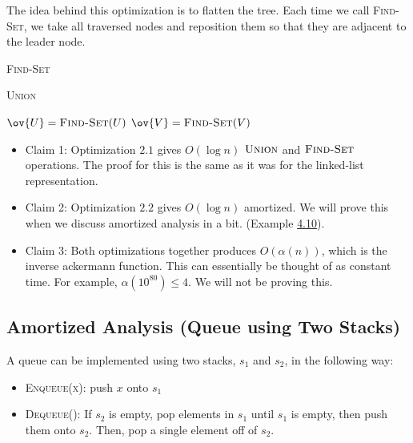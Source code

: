 The idea behind this optimization is to flatten the tree. Each time we call \textsc{Find-Set}, we take all traversed nodes and reposition them so that they are adjacent to the leader node. \V

\begin{algorithm}[H]
\DontPrintSemicolon
\SetNoFillComment

\caption{\textsc{Find-Set}}\label{alg:findset}
\end{algorithm}

\begin{algorithm}[H]
\DontPrintSemicolon
\SetNoFillComment

\caption{\textsc{Union}}\label{alg:union}
$\ov{U} = \textsc{Find-Set}(U)$\;
$\ov{V} = \textsc{Find-Set}(V)$\;
 \Return
{}  
\end{algorithm}
\begin{itemize}
    \item Claim 1: Optimization $2.1$ gives $O(\log n)$ $\textsc{Union}$ and $\textsc{Find-Set}$ operations. The proof for this is the same as it was for the linked-list representation. 
    \item Claim 2: Optimization $2.2$ gives $O(\log n)$ amortized. We will prove this when we discuss amortized analysis in a bit. (Example \hyperlink{pathcompression}{4.10}).
    \item Claim 3: Both optimizations together produces $O(\alpha(n))$, which is the \ac{inverse ackermann} function. This can essentially be thought of as constant time. For example, $\alpha(10^{80})\leq 4$. We will not be proving this. 
\end{itemize}

\subsection{Amortized Analysis (Queue using Two Stacks)}

A queue can be implemented using two stacks, $s_1$ and $s_2$, in the following way: 
\begin{itemize}
    \item \textsc{Enqueue(x)}: push $x$ onto $s_1$
    \item \textsc{Dequeue()}: If $s_2$ is empty, pop elements in $s_1$ until $s_1$ is empty, then push them onto $s_2$. Then, pop a single element off of $s_2$.
\end{itemize}

